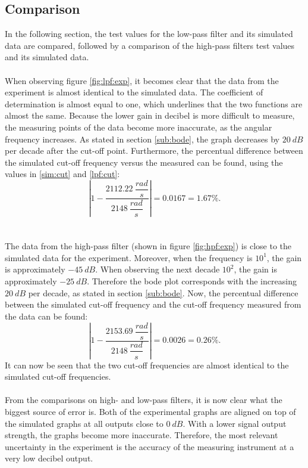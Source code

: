 \subsection{Comparison}
In the following section, the test values for the low-pass filter and its simulated data are compared, followed by a comparison of the high-pass filters test values and its simulated data.
\\ \\
When observing figure \ref{fig:lpf:exp}, it becomes clear that the data from the experiment is almost identical to the simulated data. The coefficient of determination is almost equal to one, which underlines that the two functions are almost the same. Because the lower gain in decibel is more difficult to measure, the measuring points of the data become more inaccurate, as the angular frequency increases. As stated in section \ref{sub:bode}, the graph decreases by $20\ dB$ per decade after the cut-off point. Furthermore, the percentual difference between the simulated cut-off frequency versus the measured can be found, using the values in \eqref{sim:cut} and \eqref{lpf:cut}: $$\left|1-\dfrac{2112.22\ \dfrac{rad}{s}}{2148\ \dfrac{rad}{s}}\right|= 0.0167 = 1.67 \%.$$
\\ \\
The data from the high-pass filter (shown in figure \ref{fig:hpf:exp}) is close to the simulated data for the experiment. Moreover, when the frequency is $10^{1}$, the gain is approximately $-45\ dB$. When observing the next decade $10^{2}$, the gain is approximately $-25\ dB$. Therefore the bode plot corresponds with the increasing $20\ dB$ per decade, as stated in section \ref{sub:bode}. Now, the percentual difference between the simulated cut-off frequency  and the cut-off frequency measured from the data can be found: 
$$\left|1-\dfrac{2153.69\ \dfrac{rad}{s}}{2148\ \dfrac{rad}{s}}\right|= 0.0026 = 0.26 \%.$$
It can now be seen that the two cut-off frequencies are almost identical to the simulated cut-off frequencies.
\\ \\
From the comparisons on high- and low-pass filters, it is now clear what the biggest source of error is. Both of the experimental graphs are aligned on top of the simulated graphs at all outputs close to $0\ dB$. With a lower signal output strength, the graphs become more inaccurate. Therefore, the most relevant uncertainty in the experiment is the accuracy of the measuring instrument at a very low decibel output.